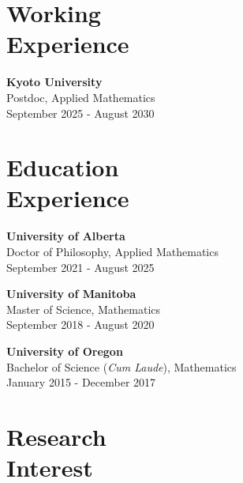 \documentclass[margin]{res}
\begin{document}
\begin{resume}


\section{Working\\Experience}
\textbf{Kyoto University}\\
Postdoc, Applied Mathematics\\
September 2025 - August 2030 














\section{Education\\Experience}
\textbf{University of Alberta}\\
Doctor of Philosophy, Applied Mathematics\\
September 2021 - August 2025


\textbf{University of Manitoba}\\
Master of Science, Mathematics\\
September 2018 - August 2020 


\textbf{University of Oregon} \\
Bachelor of Science ({\sl Cum Laude}), Mathematics\\
January 2015 - December 2017





\section{Research\\Interest}


\end{resume}
\end{document}
